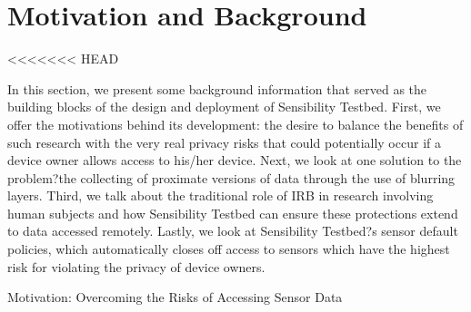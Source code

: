 \section{Motivation and Background}\label{sec-motivation}

<<<<<<< HEAD

 In this section, we present some background information that served as the building blocks of the  design and deployment of Sensibility Testbed. First, we offer the motivations behind its development: the desire to balance the benefits of such research with the very real privacy risks that could potentially occur if a device owner allows access to his/her device. Next, we look at one solution to the problem?the collecting of proximate versions of data through the use of blurring layers. Third, we talk about the traditional role of IRB in research involving human subjects and how Sensibility Testbed can ensure these protections extend to data accessed remotely. Lastly, we look at Sensibility Testbed?s sensor default policies, which automatically closes off access to sensors which have the highest risk for violating the privacy of device owners.


Motivation: Overcoming the Risks of Accessing Sensor Data

